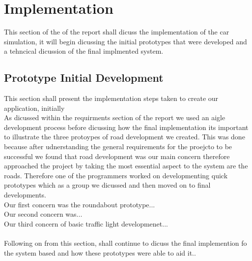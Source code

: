 \documentclass[11pt]{article}
\begin{document}
	\section{Implementation} %
This section of the of the report shall dicuss the implementation of the car simulation, it will begin dicussing the initial prototypes that were developed and a tehncical dicussion of the final implmented system. 
	\subsection{Prototype Initial Development}
This section shall present the implementation steps taken to create our application, initially 
\\
As dicussed within the requirments section of the report we used an aigle development process before dicussing how the final implementation its important to illustrate the three protoypes of road development we created. This was done because after udnerstanding the general requirements for the proejcto to be successful we found that road development was our main concern therefore approached the project by taking the most essential aspect to the system are the roads. Therefore one of the programmers worked on developmenting quick prototypes which as a group we dicussed and then moved on to final developments.\\
Our first concern was the roundabout prototype...\\
Our second concern was...\\
Our third concern of basic traffic light developmenet...\\
\\
Following on from this section, shall continue to dicuss the final implemention fo the system based and how these prototypes were able to aid it..
\end{document}
